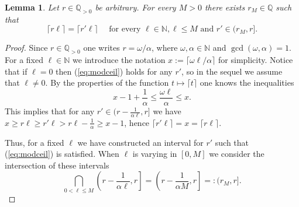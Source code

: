 \documentclass[oneside]{amsart}
\numberwithin{equation}{section}
\numberwithin{equation}{subsection}
\theoremstyle{plain}
\newtheorem{lemma}[equation]{Lemma}
\theoremstyle{definition}
\def\Q{\mathbb Q}
\newcommand{\w}{\omega}
\newcommand{\al}{\alpha}
\newcommand{\Na}{\mathbb{N}}
\renewcommand{\Q}{\mathbb{Q}}
\begin{document}
    \begin{lemma}
        \label{lm:perturb}
        Let $r\in\Q_{>0}$ be arbitrary. For every $M>0$ there exists $r_M\in \Q$
        such that 
        \begin{equation}\label{eq:modceil}
        \lceil r\ell\rceil=\lceil r'\ell\rceil\quad\mbox{ for every } \ell\in\Na, \ell\leq M
        \mbox{ and }r'\in(r_M,r].    
        \end{equation}
    \end{lemma}
    \begin{proof}
        Since $r\in\Q_{>0}$ one writes $r=\w/\al$, where $\w,\al\in\Na$ and $\gcd(\w,\al)=1$. For a fixed $\ell\in \mathbb{N}$ we introduce the notation $x:=\lceil \w\ell/\al \rceil$ for simplicity. Notice that if $\ell=0$ then (\ref{eq:modceil}) holds for any $r'$, so in the sequel we assume that $\ell\neq 0$.
        By the properties of the 
        function $t\mapsto \lceil t\rceil$ one knows the inequalities
        \[
        x-1+\frac{1}{\al}\le \frac{\w\ell}{\al}\le x.    
        \]  
        This implies that for any $r'\in(r-\frac{1}{\al\ell},r]$  we have
        $
        x\ge r\ell\ge r'\ell>r\ell-\frac{1}{\al}\ge x-1   
        $,
        hence $\lceil r'\ell\rceil=x=\lceil r\ell\rceil$.
        
        Thus, for a fixed $\ell$ we have constructed an interval for $r'$ such that (\ref{eq:modceil}) is satisfied. When $\ell$ is varying in $[0,M]$ we consider the intersection of these intervals 
        \[
            \bigcap_{0<\ell\le M} \left(r-\frac{1}{\al\ell},r\right]=\left(r-\frac{1}{\al M},r\right]=:(r_M,r].  
        \]
    
    \end{proof}
\end{document}

